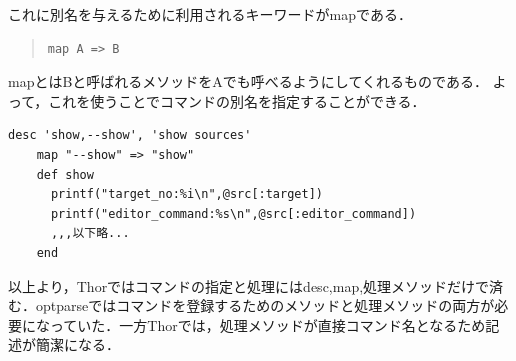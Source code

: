 これに別名を与えるために利用されるキーワードがmapである．
\begin{quote}\begin{verbatim}
map A => B
\end{verbatim}\end{quote}
mapとはBと呼ばれるメソッドをAでも呼べるようにしてくれるものである．
よって，これを使うことでコマンドの別名を指定することができる．
\begin{lstlisting}[style=customRuby]
    desc 'show,--show', 'show sources'
    map "--show" => "show"
    def show
      printf("target_no:%i\n",@src[:target])
      printf("editor_command:%s\n",@src[:editor_command])
      ,,,以下略...
    end
\end{lstlisting}
以上より，Thorではコマンドの指定と処理にはdesc,map,処理メソッドだけで済む．optparseではコマンドを登録するためのメソッドと処理メソッドの両方が必要になっていた．一方Thorでは，処理メソッドが直接コマンド名となるため記述が簡潔になる．

